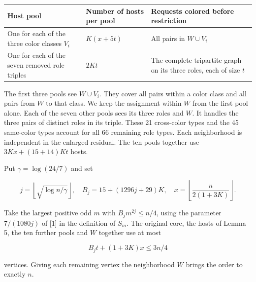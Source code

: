 \documentclass[english,11pt,a4paper]{article}
\newcounter{none}
\begin{document}
{\def\LTcaptype{none} %
\begin{longtable}[]{@{}
  >{\raggedright\arraybackslash}p{}
  >{\raggedleft\arraybackslash}p{}
  >{\raggedright\arraybackslash}p{}@{}}
\toprule\noalign{}
\begin{minipage}[b]{\linewidth}\raggedright
Host pool
\end{minipage} & \begin{minipage}[b]{\linewidth}\raggedleft
Number of hosts per pool
\end{minipage} & \begin{minipage}[b]{\linewidth}\raggedright
Requests colored before restriction
\end{minipage} \\
\midrule\noalign{}
\endhead
\bottomrule\noalign{}
\endlastfoot
One for each of the three color classes \(V_i\) & \(K(x+5t)\) & All pairs in \(W\cup V_i\) \\
One for each of the seven removed role triples & \(2Kt\) & The complete tripartite graph on its three roles, each of size \(t\) \\
\end{longtable}
}

The first three pools see \(W\cup V_i\). They cover all pairs within a color class and all pairs from \(W\) to that class. We keep the assignment within \(W\) from the first pool alone. Each of the seven other pools sees its three roles and \(W\). It handles the three pairs of distinct roles in its triple. These 21 cross-color types and the 45 same-color types account for all 66 remaining role types. Each neighborhood is independent in the enlarged residual. The ten pools together use \(3Kx+(15+14)Kt\) hosts.

Put \(\gamma=\log(24/7)\) and set

\[j=\left\lfloor\sqrt{\log n/\gamma}\right\rfloor,\quad
B_j=15+(1296j+29)K,\quad
x=\left\lfloor\frac{n}{2(1+3K)}\right\rfloor.\]

Take the largest positive odd \(m\) with \(B_jm^{2j}\le n/4\), using the parameter \(7/(1080j)\) of {[}1{]} in the definition of \(S_m\). The original core, the hosts of Lemma 5, the ten further pools and \(W\) together use at most

\[B_jt+(1+3K)x\le 3n/4\]

vertices. Giving each remaining vertex the neighborhood \(W\) brings the order to exactly \(n\).
\end{document}
